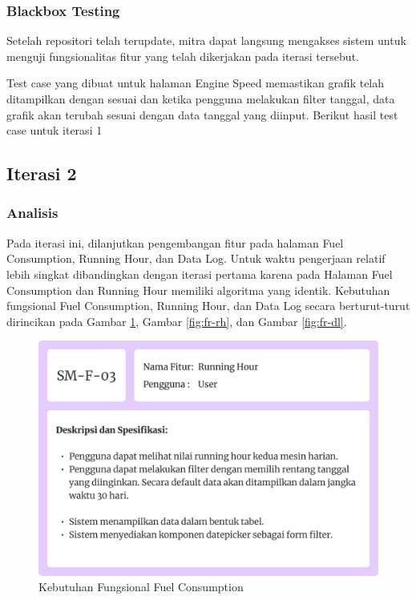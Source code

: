\begin{landscape}

    \subsubsection{Blackbox Testing}

    Setelah repositori telah terupdate, mitra dapat langsung mengakses sistem untuk menguji fungsionalitas fitur yang telah dikerjakan pada iterasi tersebut.

    

    Test case yang dibuat untuk halaman Engine Speed memastikan grafik telah ditampilkan dengan sesuai dan ketika pengguna melakukan filter tanggal, data grafik akan terubah sesuai dengan data tanggal yang diinput. Berikut hasil test case untuk iterasi 1

    

\end{landscape}

\subsection{Iterasi 2}

\subsubsection{Analisis}

Pada iterasi ini, dilanjutkan pengembangan fitur pada halaman Fuel Consumption, Running Hour, dan Data Log. Untuk waktu pengerjaan relatif lebih singkat dibandingkan dengan iterasi pertama karena pada Halaman Fuel Consumption dan Running Hour memiliki algoritma yang identik. Kebutuhan fungsional Fuel Consumption, Running Hour, dan Data Log secara berturut-turut dirincikan pada Gambar \ref{fig:fr-fc}, Gambar \ref{fig:fr-rh}, dan Gambar \ref{fig:fr-dl}.

\begin{figure}[!h]
    \includegraphics[width=.8\linewidth, center]{images/hasil/iterations/2/fr-rh.png}
    \caption{Kebutuhan Fungsional Fuel Consumption}
    \label{fig:fr-fc}
\end{figure}

